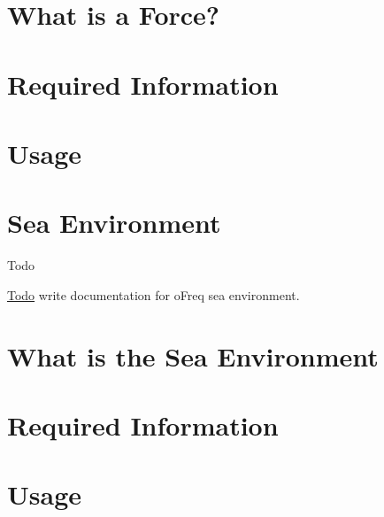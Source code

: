 \section*{What is a Force?}

\section*{Required Information}

\section*{Usage}\hypertarget{concept_seaenv}{}\section{Sea Environment}\label{concept_seaenv}
\begin{DoxyRefDesc}{Todo}
\item[\hyperlink{todo__todo000004}{Todo}]write documentation for o\-Freq sea environment.\end{DoxyRefDesc}


\section*{What is the Sea Environment}

\section*{Required Information}

\section*{Usage}